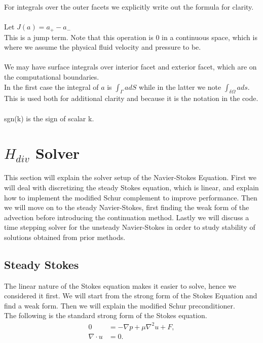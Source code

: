 \documentclass[11pt,twoside,a4paper]{article}
\begin{document}
For integrals over the outer facets we explicitly write out the formula for clarity.\\
\\
Let $J(a) = a_+ - a_-$\\
This is a jump term. Note that this operation is $0$ in a continuous space, which is where we assume the physical fluid velocity and pressure to be.\\
\\
We may have surface integrals over interior facet and exterior facet, which are on the computational boundaries.\\
In the first case the integral of $a$ is $\int_\Gamma a dS$ while in the latter we note $\int_{\delta \Omega} a ds$.\\
This is used both for additional clarity and because it is the notation in the code.\\
\\
sgn(k) is the sign of scalar k.

\section{$H_{div}$ Solver}
This section will explain the solver setup of the Navier-Stokes Equation. First we will deal with discretizing the steady Stokes equation, which is linear, and explain how to implement the modified Schur complement to improve performance. Then we will move on to the steady Navier-Stokes, first finding the weak form of the advection before introducing the continuation method. Lastly we will discuss a time stepping solver for the unsteady Navier-Stokes in order to study stability of solutions obtained from prior methods.
\subsection{Steady Stokes}
The linear nature of the Stokes equation makes it easier to solve, hence we considered it first. We will start from the strong form of the Stokes Equation and find a weak form. Then we will explain the modified Schur preconditioner.\\
The following is the standard strong form of the Stokes equation.
\begin{align}
0 &= -\nabla p + \mu \nabla^2 u + F , \\
\nabla \cdot u &= 0 . \nonumber
\end{align}
\end{document}
